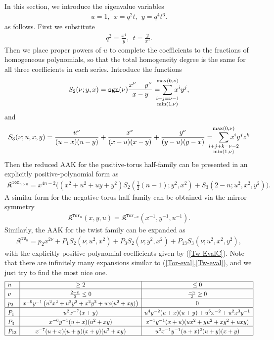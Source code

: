 \documentclass[11pt]{article}
\def\be{\begin{eqnarray}}
\def\ee{\end{eqnarray}}
\def\Kfr{\mathfrak{K}}
\def\Tor{\mathtt{Tor}}
\def\Tw{\mathtt{Tw}}
\def\sgn{\mathtt{sgn}}
\begin{document}
In this section, we introduce the eigenvalue variables
\be
u=1,\ \ x=q^2t,\ \ y=q^4t^6.\label{evars}
\ee
as follows. First we substitute 
\be
q^2=\frac{x^4}{y},\ \ t=\frac{y}{x^3}.
\ee
Then we place proper powers of $u$ to complete the coefficients to the fractions of homogeneous polynomials, so that the total homogeneity degree is the same for all three coefficients in each series. Introduce the functions
\be
S_2(\nu;y,x)=\sgn(\nu)\frac{x^{\nu}-y^{\nu}}{x-y}=\hspace{-3mm}\sum^{\max(0,\nu)}_{\substack{i+j=\nu-1\\\min(1,\nu)}}\hspace{-3mm}x^iy^j,
\ee
and
\be
S_3(\nu;u,x,y)=\frac{u^{\nu}}{(u-x)(u-y)}+\frac{x^{\nu}}{(x-u)(x-y)}+\frac{y^{\nu}}{(y-u)(y-x)}=
\hspace{-3mm}\sum^{\max(0,\nu)}_{\substack{i+j+k=\nu-2\\\min(1,\nu)}}\hspace{-5mm}x^iy^jz^k	 %
\ee
Then the reduced AAK for the positive-torus half-family can be presented in an explicitly positive-polynomial form as
\be
\Kfr^{\Tor_{n>0}}=x^{4n-2}\Big(\left(x^2+u^2+uy+y^2\right)S_2\left(\textstyle{\frac{1}{2}}(n-1);y^2,x^2\right)+S_3\left(2-n;u^2,x^2,y^2\right)\Big).
\label{Tor-eval}
\ee
A similar form for the negative-torus half-family can be obtained via the mirror symmetry
\be
\Kfr^{\Tor_{n}}(x,y,u)=\Kfr^{\Tor_{-n}}(x^{-1},y^{-1},u^{-1}).
\ee
Similarly, the AAK for the twist family can be expanded as
\be
\Kfr^{\Tw_n}=p_2x^{2\nu}+P_1S_2(\nu;u^2,x^2)+P_3S_2(\nu;y^2,x^2)+P_{13}S_3(\nu;u^2,x^2,y^2),\label{Tw-eval}
\ee
with the explicitly positive polynomial coefficients given by (\ref{Tw-EvalC}). Note that there are infinitely many expansions similar to (\ref{Tor-eval},\ref{Tw-eval}), and we just try to find the most nice one.
\be
\begin{array}{|l|c|c|}
	\hline
	n&\ge2&\le0\\
	\hline\rule{0pt}{4mm}
	\nu&\frac{2-n}{2}\le0&\frac{-n}{2}\ge0\\
	\hline\rule{0pt}{4mm}
	p_2&x^{-9}y^{-1}\left(u^2x^2+u^2y^2+x^2y^2+ux(u^2+xy)\right)&0\\
	\hline\rule{0pt}{4mm}
	P_1&u^2x^{-7}(x+y)&u^4y^{-2}(u+x)(u+y)+u^6x^{-2}+u^2x^3y^{-1}\\
	\hline\rule{0pt}{4mm}
	P_3&x^{-6}y^{-1}(u+x)(u^2+xy)&x^{-1}y^{-1}(x+u)(ux^2+yu^2+xy^2+uxy)\\
	\hline\rule{0pt}{4mm}
	P_{13}&x^{-7}(u+x)(u+y)(x+y)(u^2+xy)&u^2x^{-1}y^{-1}(u+x)^2(u+y)(x+y)\\
	\hline
\end{array}
\label{Tw-EvalC}
\ee
\end{document}
